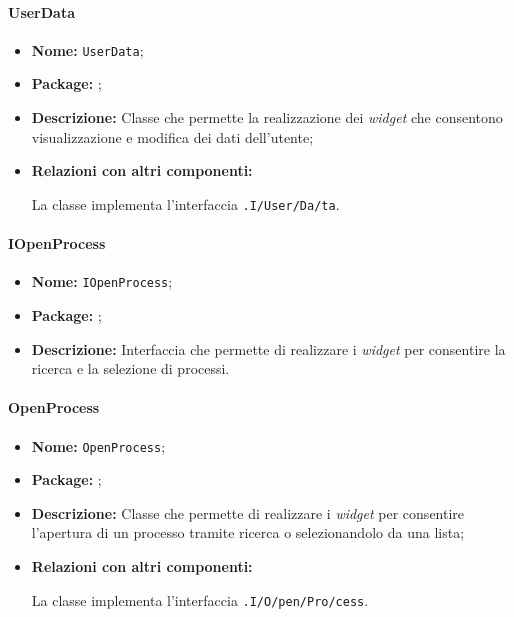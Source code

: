 \paragraph{UserData}
\begin{flushleft}
\begin{itemize}
\item \textbf{Nome:} \texttt{UserData};
\item \textbf{Package:} \texttt{\viewUser{}};
\item \textbf{Descrizione:} Classe che permette la realizzazione dei \textit{widget} che consentono visualizzazione e modifica dei dati dell'utente;
\item \textbf{Relazioni con altri componenti:}
\begin{sloppypar}
La classe implementa l'interfaccia \texttt{\viewUser{}.I\fshyp{}User\fshyp{}Da\fshyp{}ta}.
\end{sloppypar}
\end{itemize}
\end{flushleft}

\paragraph{IOpenProcess}
\begin{itemize}
\item \textbf{Nome:} \texttt{IOpenProcess};
\item \textbf{Package:} \texttt{\viewUser{}};
\item \textbf{Descrizione:} Interfaccia che permette di realizzare i \textit{widget} per consentire la ricerca e la selezione di processi.
\end{itemize}

\paragraph{OpenProcess}
\begin{flushleft}
\begin{itemize}
\item \textbf{Nome:} \texttt{OpenProcess};
\item \textbf{Package:} \texttt{\viewUser{}};
\item \textbf{Descrizione:} Classe che permette di realizzare i \textit{widget} per consentire l'apertura di un processo tramite ricerca o selezionandolo da una lista;
\item \textbf{Relazioni con altri componenti:}
\begin{sloppypar}
La classe implementa l'interfaccia \texttt{\viewUser{}.I\fshyp{}O\fshyp{}pen\fshyp{}Pro\fshyp{}cess}.
\end{sloppypar}
\end{itemize}
\end{flushleft}

